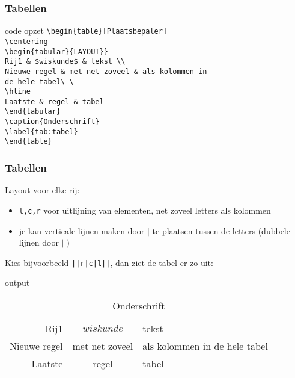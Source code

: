 \documentclass{beamer}
\begin{document}
\begin{frame}
	\frametitle{Tabellen}
	\begin{block}{code opzet}
		\texttt{\textbackslash begin\{table\}[Plaatsbepaler]\\
		\quad	\textbackslash centering\\
		\quad	\textbackslash begin\{tabular\}\{LAYOUT\}\}\\
		\qquad	Rij1 \& \$wiskunde\$ \& tekst \textbackslash \textbackslash\\
		\qquad	Nieuwe regel \& met net zoveel \& als kolommen in\\
		\qquad de hele tabel\textbackslash
			\textbackslash\\
		\qquad	\textbackslash hline\\
		\qquad	Laatste \& regel \& tabel\\
		\quad	\textbackslash end\{tabular\}\\
		\quad	\textbackslash caption\{Onderschrift\}\\
		\quad	\textbackslash label\{tab:tabel\}\\
			\textbackslash end\{table\}}
	\end{block}
\end{frame}
\begin{frame}
	\frametitle{Tabellen}
	Layout voor elke rij:
	\begin{itemize}
		\item \texttt{l,c,r} voor uitlijning van elementen, net zoveel letters als kolommen
		\item je kan verticale lijnen maken door $|$ te plaatsen tussen de letters (dubbele lijnen door $||$)
	\end{itemize}
Kies bijvoorbeeld \texttt{||r|c|l||}, dan ziet de tabel er zo uit:
	\begin{block}{output}
		{\begin{table}
				\centering
				\begin{tabular}{||r|c|l||}
					Rij1 & $wiskunde$ & tekst\\
					Nieuwe regel & met net zoveel & als kolommen in de hele tabel\\
					\hline
					Laatste & regel & tabel
				\end{tabular}
				\caption{Onderschrift}
				\label{tab: tabel}
		\end{table}}
	\end{block}
\end{frame}
\end{document}
